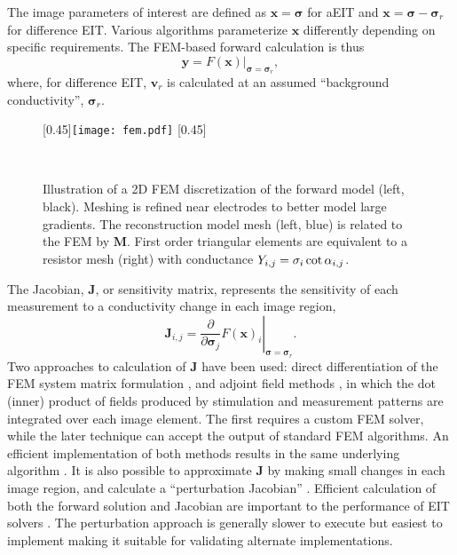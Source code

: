 \documentclass[10pt,journal]{IEEEtran}\def\TBLWIDA{15mm}\def\TBLWIDB{60mm}
\newcommand{\xB}{\mathbf{x}}
\newcommand{\yB}{\mathbf{y}}
\newcommand{\vB}{\mathbf{v}}
\newcommand{\MB}{\mathbf{M}}
\newcommand{\JB}{\mathbf{J}}
\newcommand{\sG}{\bm{\sigma}}
\begin{document}
The image parameters of interest are defined as $\xB = \sG$ for aEIT and
$\xB = \sG - \sG_r$ for difference EIT. Various algorithms parameterize
$\xB$ differently depending on specific requirements.
The FEM-based forward calculation is thus
\begin{equation}
\yB = \left. F(\xB) \right|_{\sG = \sG_r},
\end{equation}
where, for difference EIT, $\vB_r$ is calculated at an assumed
``background conductivity'', $\sG_r$.

\begin{figure} \centering
   [0.45\columnwidth]{\texttt{[image: fem.pdf]}}\hfil
   [0.45\columnwidth]{
   }\\
\caption{%
Illustration of a 2D FEM discretization of the forward model (left, black).
Meshing is refined near electrodes to better model large gradients.
The reconstruction model mesh (left, blue) is related to the FEM by 
$\MB$. 
   First order triangular elements are equivalent to a resistor mesh (right)
with conductance $Y_{i,j} = \sigma_i \mathop{\rm cot} \alpha_{i,j}$.
}
\label{fig:FEM_mapping}
\end{figure}

The Jacobian, $\JB$, or sensitivity matrix, represents
the sensitivity of each measurement to a conductivity 
change in each image region,
\begin{equation}
\JB_{i,j} = \left. 
 \frac{\partial}
           {\partial \sG_j} F( \xB )_i 
\right|_{\sG = \sG_r}.
\end{equation}
Two approaches to calculation of $\JB$ have been used:
direct differentiation of the FEM system matrix
formulation \cite{Yorkey1987Comparing}, and
adjoint field methods \cite{Polydorides2002EIDORS},
 in which the dot (inner) product of
fields produced by stimulation and measurement patterns
are integrated over each image element.
The first requires a custom FEM solver, while the
later technique can accept the output of standard FEM algorithms.
An efficient implementation of both methods results
in the same underlying algorithm \cite{Adler2017Jacobian}.
It is also possible to approximate $\JB$ 
by making small changes in each image region, and calculate a ``perturbation
Jacobian'' \cite{Yorkey1987Comparing}.
Efficient calculation of both the forward solution and
Jacobian are important to the performance of EIT solvers \cite{Boyle2012Compute}.
The perturbation approach is generally slower to execute but easiest to
implement making it suitable for validating alternate implementations.
\end{document}
